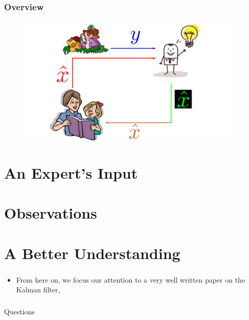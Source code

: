 \begin{frame}\pw\Large
\frametitle{Overview}
\framesubtitle{}
\begin{figure}
\includegraphics[width=0.95\textwidth]{figs/WFAR11_UCP_Update_Prediction_BlockDiagram-4.pdf}
\end{figure}
\end{frame}




\section{An Expert's Input}
\begin{frame}\pw\Large
\frametitle{}
\framesubtitle{}
\end{frame}


\section{Observations}
\begin{frame}\pw\Large
\frametitle{}
\framesubtitle{}
\end{frame}



\section{A Better Understanding}
\begin{frame}\pw\Large
\frametitle{}
\framesubtitle{}
\begin{itemize}
\item From here on, we focus our attention to a very well written paper on the Kalman filter,  
\end{itemize}
\end{frame}

\appendix
\begin{frame}\pw\Large
\frametitle{}
\framesubtitle{}
Questions
\end{frame}


